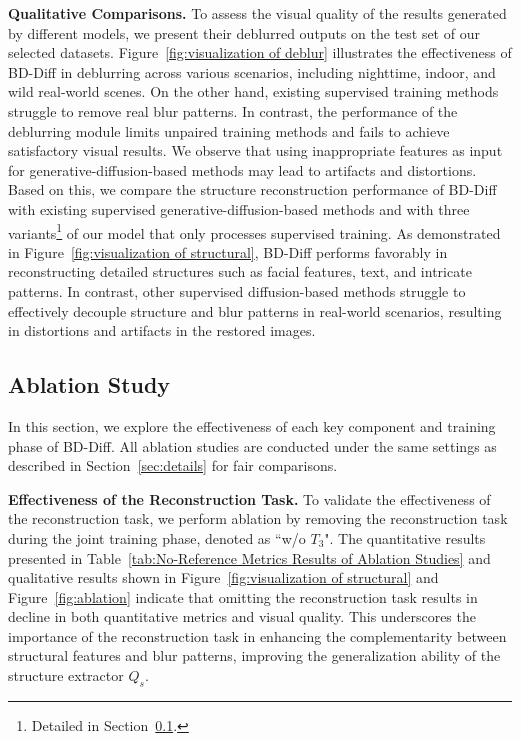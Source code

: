 \textbf{Qualitative Comparisons.}
To assess the visual quality of the results generated by different models, we present their deblurred outputs on the test set of our selected datasets. Figure~\ref{fig:visualization of deblur} illustrates the effectiveness of BD-Diff in deblurring across various scenarios, including nighttime, indoor, and wild real-world scenes. On the other hand, existing supervised training methods struggle to remove real blur patterns. In contrast, the performance of the deblurring module limits unpaired training methods and fails to achieve satisfactory visual results. We observe that using inappropriate features as input for generative-diffusion-based methods may lead to artifacts and distortions. Based on this, we compare the structure reconstruction performance of BD-Diff with existing supervised generative-diffusion-based methods and with three variants\footnote{Detailed in Section~\ref{sec:ablation}.} of our model that only processes supervised training. As demonstrated in Figure~\ref{fig:visualization of structural}, BD-Diff performs favorably in reconstructing detailed structures such as facial features, text, and intricate patterns. In contrast, other supervised diffusion-based methods struggle to effectively decouple structure and blur patterns in real-world scenarios, resulting in distortions and artifacts in the restored images.

\subsection{Ablation Study}
\label{sec:ablation}
In this section, we explore the effectiveness of each key component and training phase of BD-Diff. All ablation studies are conducted under the same settings as described in Section~\ref{sec:details} for fair comparisons.


\textbf{Effectiveness of the Reconstruction Task.} To validate the effectiveness of the reconstruction task, we perform ablation by removing the reconstruction task during the joint training phase, denoted as ``w/o $T_3$". The quantitative results presented in Table~\ref{tab:No-Reference Metrics Results of Ablation Studies} and qualitative results shown in Figure~\ref{fig:visualization of structural} and Figure~\ref{fig:ablation} indicate that omitting the reconstruction task results in decline in both quantitative metrics and visual quality. This underscores the importance of the reconstruction task in enhancing the complementarity between structural features and blur patterns, improving the generalization ability of the structure extractor $Q_s$.


